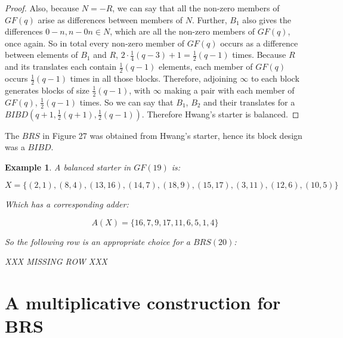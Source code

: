 \documentclass[
  11pt,
  a4paper]{book}
\newtheorem{example}{Example}
\begin{document}
\begin{proof}
Also, because $N = -R$, we can say that all the non-zero
members of $GF(q)$ arise as differences between members of
$N$. Further, $B_1$ also gives the differences
$0 - n, n - 0 n\in N$, which are all the non-zero members
of $GF(q)$, once again. So in total every non-zero member of
$GF(q)$ occurs as a difference between elements of $B_1$ and
$R$, $2 \cdot \frac{1}{4}(q - 3) + 1 = \frac{1}{2} (q - 1)$
times.  Because $R$ and its translates each contain
$\frac{1}{2}(q - 1)$ elements, each member of $GF(q)$ occurs
$\frac{1}{2}(q - 1)$ times in all those blocks. Therefore,
adjoining $\infty$ to each block generates blocks of size
$\frac{1}{2}(q - 1)$, with $\infty$ making a pair with each
member of $GF(q)$, $\frac{1}{2}(q - 1)$ times.  So we can say
that $B_1$, $B_2$ and their translates for a
$BIBD(q  +1, \frac{1}{2}(q + 1), \frac{1}{2}(q - 1))$.
Therefore Hwang’s starter is balanced. 
\end{proof}

The \(BRS\) in Figure 27 was obtained from Hwang's starter, hence its
block design was a \(BIBD\).

\begin{example}
A balanced starter in $GF(19)$ is:

\begin{equation}
X = \{(2,1),(8,4),(13,16),(14,7),(18,9),(15,17),(3,11),(12,6),(10,5)\}
\end{equation}

Which has a corresponding adder:

\begin{equation}
A(X) = \{16,7,9,17,11,6,5,1,4\}
\end{equation}

So the following row is an appropriate choice for a
$BRS(20)$:

XXX MISSING ROW XXX

\end{example}

\hypertarget{a-multiplicative-construction-for-brs}{%
\section{A multiplicative construction for BRS}\label{a-multiplicative-construction-for-brs}}
\end{document}
